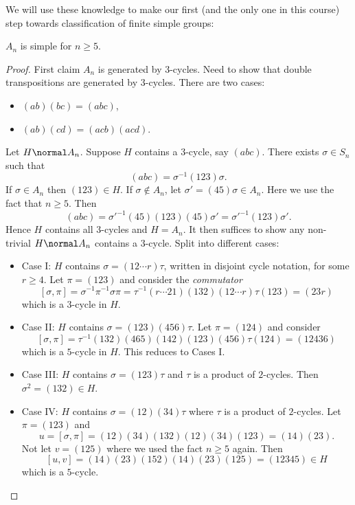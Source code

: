 \documentclass[a4paper]{article}
\theoremstyle{definition}
\begin{document}
We will use these knowledge to make our first (and the only one in this course) step towards classification of finite simple groups:

\begin{theorem}
  \(A_n\) is simple for \(n \geq 5\).
\end{theorem}

\begin{proof}
  First claim \(A_n\) is generated by \(3\)-cycles. Need to show that double transpositions are generated by \(3\)-cycles. There are two cases:
  \begin{itemize}
  \item \((ab)(bc) = (abc)\),
  \item \((ab)(cd) = (acb)(acd)\).
  \end{itemize}

  Let \(H \normal A_n\). Suppose \(H\) contains a \(3\)-cycle, say \((abc)\). There exists \(\sigma \in S_n\) such that
  \[
    (abc) = \sigma^{-1}(123)\sigma.
  \]
  If \(\sigma \in A_n\) then \((123) \in H\). If \(\sigma \notin A_n\), let \(\sigma' = (45)\sigma \in A_n\). Here we use the fact that \(n \geq 5\). Then
  \[
    (abc) = \sigma'^{-1}(45)(123)(45)\sigma' = \sigma'^{-1}(123)\sigma'.
  \]
  Hence \(H\) contains all \(3\)-cycles and \(H = A_n\). It then suffices to show any non-trivial \(H \normal A_n\) contains a \(3\)-cycle. Split into different cases:
  \begin{itemize}
  \item Case I: \(H\) contains \(\sigma = (12 \cdots r)\tau\), written in disjoint cycle notation, for some \( r \geq 4\). Let \(\pi = (123)\) and consider the \emph{commutator}
    \[
      [\sigma, \pi] = \sigma^{-1}\pi^{-1}\sigma\pi = \tau^{-1}(r \cdots 21)(132)(12 \cdots r)\tau(123) = (23r)
    \]
    which is a \(3\)-cycle in \(H\).
  \item Case II: \(H\) contains \(\sigma = (123)(456)\tau\). Let \(\pi = (124)\) and consider
    \[
      [\sigma, \pi] = \tau^{-1}(132)(465)(142)(123)(456)\tau(124) = (12436)
    \]
    which is a \(5\)-cycle in \(H\). This reduces to Cases I.
  \item Case III: \(H\) contains \(\sigma = (123)\tau\) and \(\tau\) is a product of \(2\)-cycles. Then \(\sigma^2 = (132) \in H\).
  \item Case IV: \(H\) contains \(\sigma = (12)(34)\tau\) where \(\tau\) is a product of \(2\)-cycles. Let \(\pi = (123)\) and
    \[
      u = [\sigma, \pi] = (12)(34)(132)(12)(34)(123) = (14)(23).
    \]
    Not let \(v = (125)\) where we used the fact \(n \geq 5\) again. Then
    \[
      [u, v] = (14)(23)(152)(14)(23)(125) = (12345) \in H
    \]
    which is a \(5\)-cycle.
  \end{itemize}
\end{proof}
\end{document}
